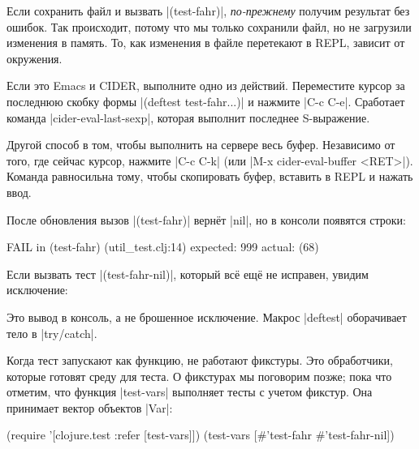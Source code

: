 Если сохранить файл и вызвать \spverb|(test-fahr)|, \emph{по-прежнему} получим
результат без ошибок. Так происходит, потому что мы только сохранили файл, но не
загрузили изменения в память. То, как изменения в файле перетекают в REPL,
зависит от окружения.


Если это Emacs и CIDER, выполните одно из действий. Переместите курсор за
последнюю скобку формы \spverb|(deftest test-fahr...)| и нажмите \spverb|C-c C-e|.
Сработает команда \spverb|cider-eval-last-sexp|, которая выполнит последнее S-выражение.

Другой способ в том, чтобы выполнить на сервере весь буфер. Независимо от того,
где сейчас курсор, нажмите \spverb|C-c C-k| (или \spverb|M-x cider-eval-buffer <RET>|).
Команда равносильна тому, чтобы скопировать буфер, вставить в REPL и нажать ввод.

После обновления вызов \spverb|(test-fahr)| вернёт \spverb|nil|, но в консоли
появятся строки:

\begin{english}
  \begin{clojure}
FAIL in (test-fahr) (util_test.clj:14)
expected: 999
  actual: (68)
  \end{clojure}
\end{english}

Если вызвать тест \spverb|(test-fahr-nil)|, который всё ещё не исправен,
увидим исключение:

\begin{english}
\end{english}

Это вывод в консоль, а не брошенное исключение. Макрос \spverb|deftest|
оборачивает тело в \spverb|try/catch|.

Когда тест запускают как функцию, не работают фикстуры. Это обработчики, которые
готовят среду для теста. О фикстурах мы поговорим позже; пока что отметим, что
функция \spverb|test-vars| выполняет тесты с учетом фикстур. Она принимает
вектор объектов \spverb|Var|:

\begin{english}
  \begin{clojure}
(require '[clojure.test :refer [test-vars]])
(test-vars [#'test-fahr #'test-fahr-nil])
  \end{clojure}
\end{english}

